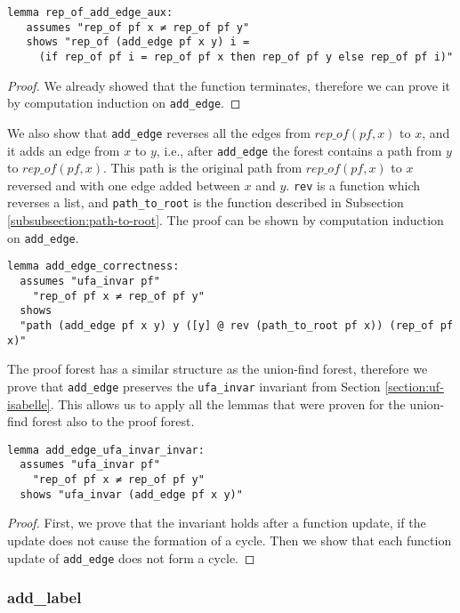 \begin{lstlisting}
lemma rep_of_add_edge_aux:
   assumes "rep_of pf x ≠ rep_of pf y"
   shows "rep_of (add_edge pf x y) i =
     (if rep_of pf i = rep_of pf x then rep_of pf y else rep_of pf i)"
\end{lstlisting}

\begin{proof}
We already showed that the function terminates, therefore we can prove it by computation induction on \lstinline{add_edge}.
\end{proof}

We also show that \lstinline|add_edge| reverses all the edges from $rep\_of(pf,x)$ to $x$, and it adds an edge from $x$ to $y$, i.e., after \lstinline|add_edge| the forest contains a path from $y$ to $rep\_of(pf,x)$. This path is the original path from $rep\_of(pf,x)$ to $x$ reversed and with one edge added between $x$ and $y$. \lstinline|rev| is a function which reverses a list, and \lstinline|path_to_root| is the function described in Subsection \ref{subsubsection:path-to-root}. The proof can be shown by computation induction on \lstinline|add_edge|.

\begin{lstlisting}
lemma add_edge_correctness:
  assumes "ufa_invar pf"
    "rep_of pf x ≠ rep_of pf y"
  shows
  "path (add_edge pf x y) y ([y] @ rev (path_to_root pf x)) (rep_of pf x)"
\end{lstlisting}

The proof forest has a similar structure as the union-find forest, therefore we prove that \lstinline|add_edge| preserves the \lstinline|ufa_invar| invariant from Section \ref{section:uf-isabelle}. This allows us to apply all the lemmas that were proven for the union-find forest also to the proof forest.

\begin{lstlisting}
lemma add_edge_ufa_invar_invar:
  assumes "ufa_invar pf"
    "rep_of pf x ≠ rep_of pf y"
  shows "ufa_invar (add_edge pf x y)"
\end{lstlisting}

\begin{proof}
First, we prove that the invariant holds after a function update, if the update does not cause the formation of a cycle. Then we show that each function update of \lstinline|add_edge| does not form a cycle.
\end{proof}

\subsubsection{add\_label}
\label{subsubsection:addlabel}

